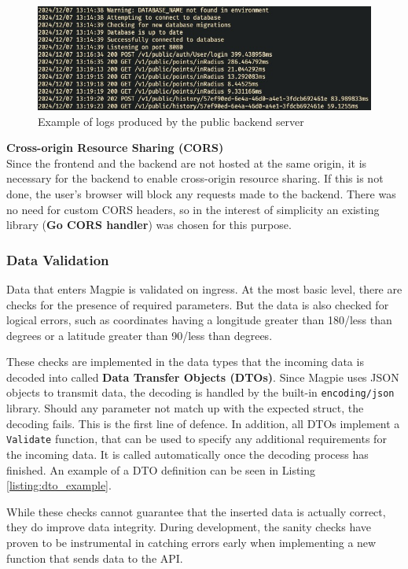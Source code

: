 \begin{figure}[htbp]
  \centering{}
  \includegraphics[width=\textwidth]{images/backend_logging.png}
  \caption{Example of logs produced by the public backend server}
  \label{fig:backend_logging}
\end{figure}

\label{middleware_cors}\textbf{Cross-origin Resource Sharing (CORS)}\\
Since the frontend and the backend are not hosted at the same origin, it is
necessary for the backend to enable cross-origin resource sharing. If this is
not done, the user's browser will block any requests made to the backend. There
was no need for custom CORS headers, so in the interest of simplicity an
existing library (\textbf{Go CORS handler}) was chosen for this purpose.

\subsubsection{Data Validation}
Data that enters Magpie is validated on ingress. At the most basic level, there
are checks for the presence of required parameters. But the data is also checked
for logical errors, such as coordinates having a longitude greater than 180/less
than  degrees or a latitude greater than 90/less than  degrees.

These checks are implemented in the data types that the incoming data is decoded
into called \textbf{Data Transfer Objects (DTOs)}. Since Magpie uses JSON
objects to transmit data, the decoding is handled by the built-in
\texttt{encoding/json} library. Should any parameter not match up with the
expected struct, the decoding fails. This is the first line of defence. In
addition, all DTOs implement a \texttt{Validate} function, that can be used to
specify any additional requirements for the incoming data. It is called
automatically once the decoding process has finished. An example of a DTO
definition can be seen in Listing \ref{listing:dto_example}.

While these checks cannot guarantee that the inserted data is actually correct,
they do improve data integrity. During development, the sanity checks have
proven to be instrumental in catching errors early when implementing a new
function that sends data to the API.

